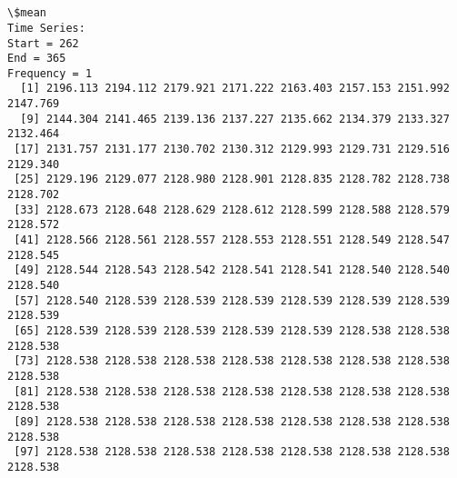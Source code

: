 \documentclass[11pt]{article}
\begin{document}
    \begin{center}
    \end{center}
    { \hspace*{\fill} \\}
    
    \begin{center}
    \end{center}
    { \hspace*{\fill} \\}
    
    \begin{Verbatim}[commandchars=\\\{\}]
\$mean
Time Series:
Start = 262 
End = 365 
Frequency = 1 
  [1] 2196.113 2194.112 2179.921 2171.222 2163.403 2157.153 2151.992 2147.769
  [9] 2144.304 2141.465 2139.136 2137.227 2135.662 2134.379 2133.327 2132.464
 [17] 2131.757 2131.177 2130.702 2130.312 2129.993 2129.731 2129.516 2129.340
 [25] 2129.196 2129.077 2128.980 2128.901 2128.835 2128.782 2128.738 2128.702
 [33] 2128.673 2128.648 2128.629 2128.612 2128.599 2128.588 2128.579 2128.572
 [41] 2128.566 2128.561 2128.557 2128.553 2128.551 2128.549 2128.547 2128.545
 [49] 2128.544 2128.543 2128.542 2128.541 2128.541 2128.540 2128.540 2128.540
 [57] 2128.540 2128.539 2128.539 2128.539 2128.539 2128.539 2128.539 2128.539
 [65] 2128.539 2128.539 2128.539 2128.539 2128.539 2128.538 2128.538 2128.538
 [73] 2128.538 2128.538 2128.538 2128.538 2128.538 2128.538 2128.538 2128.538
 [81] 2128.538 2128.538 2128.538 2128.538 2128.538 2128.538 2128.538 2128.538
 [89] 2128.538 2128.538 2128.538 2128.538 2128.538 2128.538 2128.538 2128.538
 [97] 2128.538 2128.538 2128.538 2128.538 2128.538 2128.538 2128.538 2128.538


\end{Verbatim}
\end{document}
